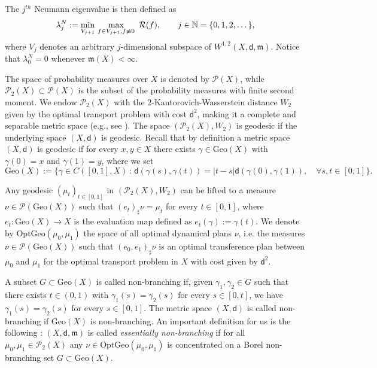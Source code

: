 \documentclass[12pt]{article}
\newcommand{\N}{\mathbb{N}}
\newcommand{\mm}{\mathfrak m}
\newcommand{\di}{\mathsf{d}}
\theoremstyle{plain}
\theoremstyle{definition}
\begin{document}
The $j^{th}$ Neumann eigenvalue is then defined as
\begin{equation}\label{def: m-th Neum eigen}
\lambda^N_j:= \min_{V_{j+1}}\, \max_{f\in V_{j+1},\\ f\not\equiv 0} \ \mathcal{R}(f),\qquad j\in \N=\{0,1,2,\dots\},
\end{equation}
where $V_{j}$ denotes an arbitrary $j$-dimensional subspace of $W^{1,2}(X,\di,\mm)$. Notice that $\lambda_0^N=0$ whenever $\mm(X)<\infty.$

The space of probability measures over $X$ is denoted by $\mathcal{P}(X)$, while $\mathcal{P}_2(X)\subset\mathcal{P}(X)$ is the subset of the probability measures with finite second moment. We endow $\mathcal{P}_2(X)$ with the $2$-Kantorovich-Wasserstein distance $W_2$ given by the optimal transport problem with cost $\di^2$, making it a complete and separable metric space (e.g., see \cite{Vil}). The space $(\mathcal{P}_2(X),W_2)$ is geodesic if the underlying space $(X,\di)$ is geodesic. Recall that by definition a metric space $(X,\di)$ is geodesic if for every $x,y\in X$ there exists $\gamma\in \mathrm{Geo}(X)$ with $\gamma(0)=x$ and $\gamma(1)=y$, where we set
$$ \mathrm{Geo}(X):=\{\gamma\in C([0,1],X)\, : \, \di(\gamma(s),\gamma(t))=|t-s|\di(\gamma(0),\gamma(1)), \quad \forall s,t\in[0,1]\}.$$

Any geodesic $(\mu_t)_{t\in [0,1]}$ in $(\mathcal{P}_2(X),W_2)$ can be lifted to a measure $\nu\in\mathcal{P}(\mathrm{Geo}(X))$
such that $(e_t)_{\sharp}\nu=\mu_t$ for every $t\in [0,1]$, where $e_t:\mathrm{Geo}(X)\rightarrow X$ is the evaluation map defined as $e_t(\gamma):=\gamma(t)$. We denote by $\mathrm{OptGeo}(\mu_0,\mu_1)$ the space of all optimal dynamical plans $\nu$, i.e. the measures $\nu\in\mathcal{P}(\mathrm{Geo}(X))$ such that $(e_0,e_1)_{\sharp}\nu$ is an optimal transference plan between $\mu_0$ and $\mu_1$ for the optimal transport problem in $X$ with cost given by $\di^2$.

A subset $G\subset \mathrm{Geo}(X)$ is called non-branching if, given $\gamma_1,\gamma_2\in G$ such that there exists $t\in (0,1)$ with $\gamma_1(s)=\gamma_2(s)$ for every $s\in [0,t]$, we have $\gamma_1(s)=\gamma_2(s)$ for every $s\in [0,1]$. The metric space $(X,\di)$ is called non-branching if $\mathrm{Geo}(X)$ is non-branching. An important definition for us is the following \cite{rajala-sturm}: $(X, \di, \mm)$ is called \emph{essentially non-branching} if for all $\mu_0,\mu_1 \in\mathcal{P}_2(X)$ any $\nu\in \mathrm{OptGeo}(\mu_0,\mu_1)$ is concentrated on a Borel non-branching set $G\subset \mathrm{Geo}(X)$.
\end{document}
